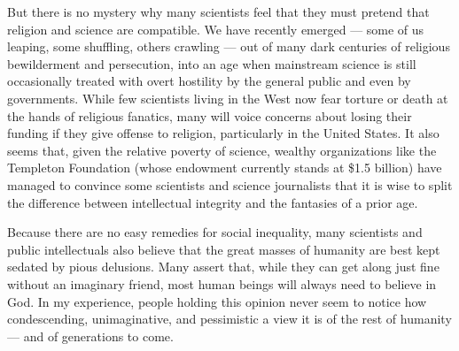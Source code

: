 \documentclass[a4paper,14pt]{extarticle}
\begin{document}
But there is no mystery why many scientists feel that they must pretend that religion and science are compatible.
We have recently emerged --- some of us leaping, some shuffling, others crawling --- out of many dark centuries of religious bewilderment and persecution, into an age when mainstream science is still occasionally treated with overt hostility by the general public and even by governments.
While few scientists living in the West now fear torture or death at the hands of religious fanatics, many will voice concerns about losing their funding if they give offense to religion, particularly in the United States.
It also seems that, given the relative poverty of science, wealthy organizations like the Templeton Foundation (whose endowment currently stands at \$1.5 billion) have managed to convince some scientists and science journalists that it is wise to split the difference between intellectual integrity and the fantasies of a prior age.

Because there are no easy remedies for social inequality, many scientists and public intellectuals also believe that the great masses of humanity are best kept sedated by pious delusions.
Many assert that, while they can get along just fine without an imaginary friend, most human beings will always need to believe in God.
In my experience, people holding this opinion never seem to notice how condescending, unimaginative, and pessimistic a view it is of the rest of humanity --- and of generations to come.
\end{document}

